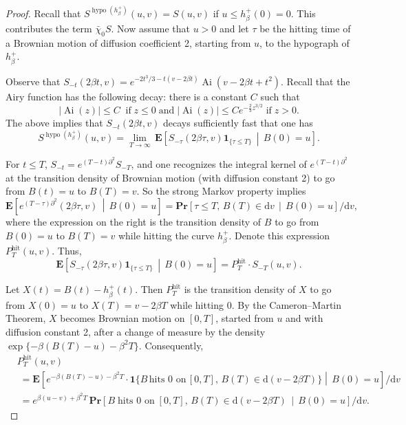 \documentclass[10pt]{amsart}
\theoremstyle{definition}\newtheorem{defi}[theo]{Definition}\newtheorem{rema}[theo]{Remark}\newtheorem{exam}[theo]{Example}\newtheorem{exem}[theo]{Example}\newtheorem{nota}[theo]{Notation}
\newcommand*{\dd}{\mathrm{d}}
\newcommand*{\dv}{\dd v}
\DeclareMathOperator{\hit}{hit}
\DeclareMathOperator{\hypo}{hypo}
\DeclareMathOperator{\Ai}{Ai}
\newcommand{\E}[1]{\mathbf{E}\left[#1\right]}
\newcommand{\pr}[1]{\mathbf{Pr}\left[#1\right]}
\newcommand{\ind}[1]{\mathbf{1}_{\{ #1 \}}}
\begin{document}
\begin{proof}
Recall that $S^{\hypo(h^{+}_{\beta})}(u,v) = S(u,v)$ if $u \leq h^{+}_{\beta}(0) = 0$. This contributes the term $\bar{\chi}_0 S$. Now assume that $u > 0$ and let $\tau$ be the hitting time of a Brownian motion of diffusion coefficient 2, starting from $u$, to the hypograph of $h^{+}_{\beta}$.

Observe that $S_{-t}(2\beta t, v) = e^{-2t^3/3 -t(v-2\beta t)}\Ai(v-2\beta t + t^2)$. Recall that the Airy function has the following decay: there is a constant $C$ such that
\begin{equation}\label{eqn:Airydecay}
\mathopen|\Ai(z)| \leq C\;\;\text{if}\; z \leq 0 \;\text{and}\; \mathopen|\Ai(z)| \leq C e^{-\frac{2}{3} z^{3/2}} \; \text{if}\; z > 0.
\end{equation}
The above implies that $S_{-t}(2\beta t, v)$ decays sufficiently fast that one has
\[
S^{\hypo(h^{+}_{\beta})}(u,v) = \lim_{T \to \infty}\, \E{ S_{-\tau}(2 \beta \tau, v) \ind{\tau \leq T} \,\middle|\, B(0) = u}.
\]

For $t \leq T$, $S_{-t} = e^{(T-t)\partial^2} S_{-T}$, and one recognizes the integral kernel of $e^{(T-t)\partial^2}$ at the transition density of Brownian motion (with diffusion constant 2) to go from $B(t) = u$ to $B(T) = v$. So the strong Markov property implies
\[
\E{ e^{(T-\tau)\partial^2}(2\beta \tau, v) \,\middle|\, B(0)=u} = \pr{ \tau \leq T,\, B(T) \in \dv \,\middle|\, B(0) = u} / \dv,
\]
where the expression on the right is the transition density of $B$ to go from $B(0) = u$ to $B(T) = v$ while hitting the curve $h^{+}_{\beta}$. Denote this expression $P^{\hit}_T(u,v)$. Thus,
\[
\E{ S_{-\tau}(2 \beta \tau, v) \ind{\tau \leq T} \,\middle|\, B(0) = u} = P^{\hit}_T \cdot S_{-T}(u,v).
\]

Let $X(t) = B(t) - h^{+}_{\beta}(t)$. Then $P^{\hit}_T$ is the transition density of $X$ to go from $X(0) = u$ to $X(T) = v - 2\beta T$ while hitting $0$. By the Cameron--Martin Theorem, $X$ becomes Brownian motion on $[0,T]$, started from $u$ and with diffusion constant 2, after a change of measure by the density $\exp \{ -\beta (B(T)-u) - \beta^2T\}$. Consequently,
\begin{align*}
&P^{\hit}_T(u,v)\\
&\;=\E{e^{-\beta (B(T)-u) -\beta^2T} \cdot\mathbf{1}\big \{B\,\text{hits 0 on}\, [0,T], \, B(T) \in \dd(v-2\beta T) \big\}\middle|\, B(0)=u} /\dv \\
&\; = e^{\beta(u-v)+ \beta^2 T} \, \pr{ B \; \text{hits 0 on}\; [0,T], \, B(T) \in \dd(v-2\beta T) \,\middle|\, B(0) = u} / \dv.
\end{align*}


\end{proof}
\end{document}
